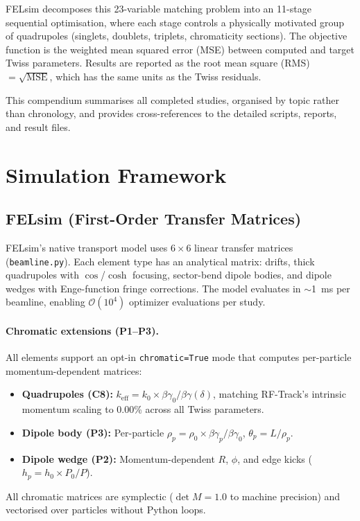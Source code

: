 \documentclass[11pt]{article}
\begin{document}
FELsim decomposes this 23-variable matching problem into an 11-stage
sequential optimisation, where each stage controls a physically motivated
group of quadrupoles (singlets, doublets, triplets, chromaticity
sections).  The objective function is the weighted mean squared error
(MSE) between computed and target Twiss parameters.  Results are reported
as the root mean square (RMS) $= \sqrt{\text{MSE}}$, which has the same
units as the Twiss residuals.

This compendium summarises all completed studies, organised by topic
rather than chronology, and provides cross-references to the detailed
scripts, reports, and result files.


\section{Simulation Framework}
\label{sec:framework}

\subsection{FELsim (First-Order Transfer Matrices)}

FELsim's native transport model uses $6\times6$ linear transfer matrices
(\texttt{beamline.py}).  Each element type has an analytical matrix:
drifts, thick quadrupoles with $\cos$/$\cosh$ focusing, sector-bend
dipole bodies, and dipole wedges with Enge-function fringe corrections.
The model evaluates in $\sim$\SI{1}{ms} per beamline, enabling
$\mathcal{O}(10^4)$ optimizer evaluations per study.

\paragraph{Chromatic extensions (P1--P3).}
All elements support an opt-in \texttt{chromatic=True} mode that computes
per-particle momentum-dependent matrices:
\begin{itemize}[nosep]
  \item \textbf{Quadrupoles (C8):} $k_\text{eff} = k_0 \times
    \beta\gamma_0 / \beta\gamma(\delta)$, matching RF-Track's intrinsic
    momentum scaling to 0.00\% across all Twiss parameters.
  \item \textbf{Dipole body (P3):} Per-particle $\rho_p = \rho_0 \times
    \beta\gamma_p / \beta\gamma_0$, $\theta_p = L/\rho_p$.
  \item \textbf{Dipole wedge (P2):} Momentum-dependent $R$, $\phi$, and
    edge kicks ($h_p = h_0 \times P_0/P$).
\end{itemize}
All chromatic matrices are symplectic ($\det M = 1.0$ to machine
precision) and vectorised over particles without Python loops.
\end{document}
